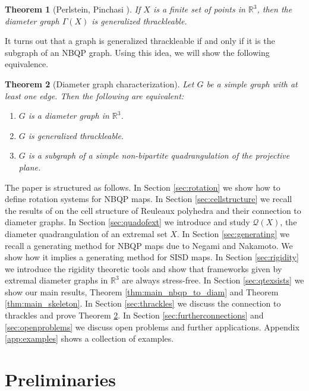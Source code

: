 \documentclass{article}
\newtheorem{theorem}{Theorem}[section]
\newcounter{example}
\newcommand{\R}[0]{\mathbb{R}}
\newcommand{\qt}{\mathcal{Q}}
\begin{document}
\begin{theorem}[Perlstein, Pinchasi \cite{ROM08}]\label{thm:diamisgent}
    If $X$ is a finite set of points in $\mathbb{R}^3$, then the diameter graph $\Gamma(X)$ is generalized thrackleable.
\end{theorem}

It turns out that a graph is generalized thrackleable if and only if it is the subgraph of an NBQP graph. Using this idea, we will show the following equivalence. 

\begin{theorem}[Diameter graph characterization]\label{thm:main_thrackleable}
    Let $G$ be a simple graph with at least one edge. Then the following are equivalent:
    \begin{enumerate}
        \item[a)] $G$ is a diameter graph in $\R^3$.
        \item[b)] $G$ is generalized thrackleable.
        \item[c)] $G$ is a subgraph of a simple non-bipartite quadrangulation of the projective plane.
    \end{enumerate}
     
\end{theorem}

The paper is structured as follows. In Section \ref{sec:rotation} we show how to define rotation systems for NBQP maps. In Section \ref{sec:cellstructure} we recall the results of \cite{kupitz2010ball} on the cell structure of Reuleaux polyhedra and their connection to diameter graphs. In Section \ref{sec:quadofext} we introduce and study $\qt(X)$, the diameter quadrangulation of an extremal set $X$.   In Section \ref{sec:generating} we recall a generating method for NBQP maps due to Negami and Nakamoto. We show how it implies a generating method for SISD maps. In Section \ref{sec:rigidity} we introduce the rigidity theoretic tools and show that frameworks given by extremal diameter graphs in $\R^3$ are always stress-free. In Section \ref{sec:qtexsists} we show our main results, Theorem \ref{thm:main_nbqp_to_diam} and Theorem \ref{thm:main_skeleton}. In Section \ref{sec:thrackles} we discuss the connection to thrackles and prove Theorem \ref{thm:main_thrackleable}. In Section \ref{sec:furtherconnections} and \ref{sec:openproblems} we discuss open problems and further applications. Appendix \ref{app:examples} shows a collection of examples. 



\section{Preliminaries}
\end{document}
